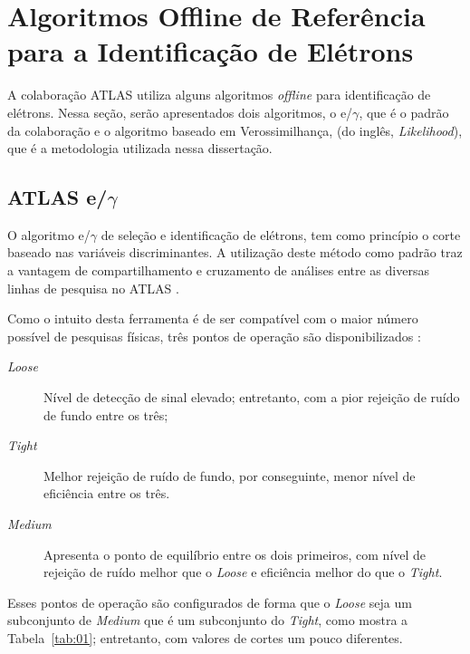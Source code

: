 \section{Algoritmos Offline de Referência para a Identificação de Elétrons}

A colaboração ATLAS utiliza alguns algoritmos \emph{offline} para identificação de elétrons. Nessa seção, serão apresentados dois algoritmos, o e/$\gamma$, que é o padrão da colaboração e o algoritmo baseado em Verossimilhança, (do inglês, \emph{Likelihood}), que é a metodologia utilizada nessa dissertação.

\subsection{ATLAS e/$\gamma$}

O algoritmo e/$\gamma$ de seleção e identificação de elétrons, tem como princípio o corte baseado nas variáveis discriminantes. A utilização deste método como padrão traz a vantagem de compartilhamento e cruzamento de análises entre as diversas linhas de pesquisa no ATLAS \cite{aad2012performance}.

Como o intuito desta ferramenta é de ser compatível com o maior número possível de pesquisas físicas, três pontos de operação são disponibilizados \cite{alison2014road}:

\begin{description}
\item[\emph{Loose}] Nível de detecção de sinal elevado; entretanto, com a pior rejeição de ruído de fundo entre os três;
\item[\emph{Tight}] Melhor rejeição de ruído de fundo, por conseguinte, menor nível de eficiência entre os três.
\item[\emph{Medium}] Apresenta o ponto de equilíbrio entre os dois primeiros, com nível de rejeição de ruído melhor que o \emph{Loose} e eficiência melhor do que o \emph{Tight}.
\end{description}

Esses pontos de operação são configurados de forma que o \emph{Loose} seja um subconjunto de \emph{Medium} que é um subconjunto do \emph{Tight}, como mostra a Tabela~\ref{tab:01}; entretanto, com valores de cortes um pouco diferentes.

